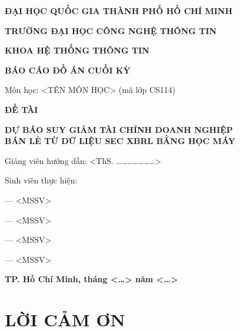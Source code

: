 \documentclass[13pt,a4paper]{extreport}
\begin{document}
\begin{titlepage}
\centering
{\bfseries\fontsize{13}{16}\selectfont ĐẠI HỌC QUỐC GIA THÀNH PHỐ HỒ CHÍ MINH\par}
\vspace{2pt}
{\bfseries\fontsize{14}{17}\selectfont TRƯỜNG ĐẠI HỌC CÔNG NGHỆ THÔNG TIN\par}
\vspace{6pt}
{\bfseries\fontsize{13}{16}\selectfont KHOA HỆ THỐNG THÔNG TIN\par}
\vspace{2.4cm}
{\bfseries\fontsize{15}{18}\selectfont BÁO CÁO ĐỒ ÁN CUỐI KỲ\par}
\vspace{0.3cm}
{\fontsize{13}{16}\selectfont Môn học: <TÊN MÔN HỌC> (mã lớp CS114)\par}
\vspace{1.0cm}
{\bfseries\fontsize{13}{16}\selectfont ĐỀ TÀI\par}
\vspace{0.4cm}
{\bfseries\fontsize{15}{18}\selectfont DỰ BÁO SUY GIẢM TÀI CHÍNH DOANH NGHIỆP\\[2pt]
BÁN LẺ TỪ DỮ LIỆU SEC XBRL BẰNG HỌC MÁY\par}
\vspace{1.4cm}
\begin{flushleft}
{\fontsize{13}{16}\selectfont Giảng viên hướng dẫn: <ThS. …………………>\par}
\vspace{0.4cm}
{\fontsize{13}{16}\selectfont Sinh viên thực hiện:\par}
\vspace{0.2cm}
{\fontsize{13}{16} --- <MSSV>\par}
{\fontsize{13}{16} --- <MSSV>\par}
{\fontsize{13}{16} --- <MSSV>\par}
{\fontsize{13}{16} --- <MSSV>\par}
\end{flushleft}
\vfill
{\bfseries\fontsize{13}{16}\selectfont TP. Hồ Chí Minh, tháng <…> năm <…>\par}
\end{titlepage}
\clearpage


\chapter*{LỜI CẢM ƠN}
\end{document}
